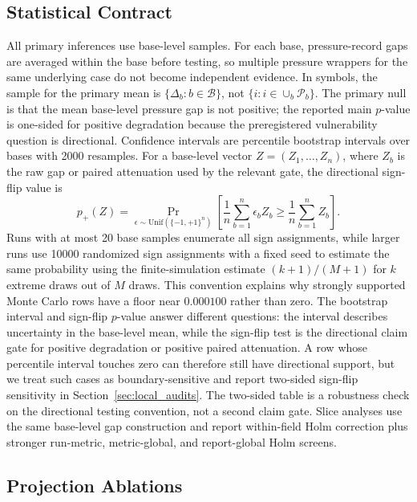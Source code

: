 \subsection{Statistical Contract}

All primary inferences use base-level samples. For each base, pressure-record gaps are averaged within the base before testing, so multiple pressure wrappers for the same underlying case do not become independent evidence. In symbols, the sample for the primary mean is $\{\Delta_b:b\in\mathcal{B}\}$, not $\{i:i\in\cup_b\mathcal{P}_b\}$. The primary null is that the mean base-level pressure gap is not positive; the reported main $p$-value is one-sided for positive degradation because the preregistered vulnerability question is directional. Confidence intervals are percentile bootstrap intervals over bases with 2000 resamples. For a base-level vector $Z=(Z_1,\ldots,Z_n)$, where $Z_b$ is the raw gap or paired attenuation used by the relevant gate, the directional sign-flip value is
\[
    p_+(Z)
    =
    \Pr_{\epsilon\sim\mathrm{Unif}(\{-1,+1\}^{n})}
    \left[
        \frac{1}{n}\sum_{b=1}^{n}\epsilon_b Z_b
        \ge
        \frac{1}{n}\sum_{b=1}^{n}Z_b
    \right].
\]
Runs with at most 20 base samples enumerate all sign assignments, while larger runs use 10000 randomized sign assignments with a fixed seed to estimate the same probability using the finite-simulation estimate $(k+1)/(M+1)$ for $k$ extreme draws out of $M$ draws. This convention explains why strongly supported Monte Carlo rows have a floor near $0.000100$ rather than zero. The bootstrap interval and sign-flip $p$-value answer different questions: the interval describes uncertainty in the base-level mean, while the sign-flip test is the directional claim gate for positive degradation or positive paired attenuation. A row whose percentile interval touches zero can therefore still have directional support, but we treat such cases as boundary-sensitive and report two-sided sign-flip sensitivity in Section~\ref{sec:local_audits}. The two-sided table is a robustness check on the directional testing convention, not a second claim gate. Slice analyses use the same base-level gap construction and report within-field Holm correction plus stronger run-metric, metric-global, and report-global Holm screens.

\subsection{Projection Ablations}

